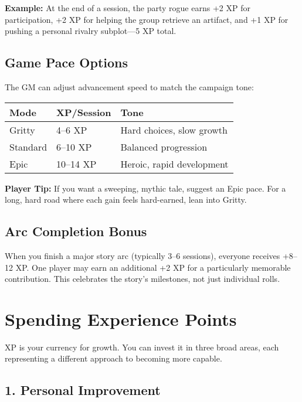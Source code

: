 \documentclass[11pt,twoside,openany]{book}
\begin{document}
\textbf{Example:} At the end of a session, the party rogue earns +2 XP for participation, +2 XP for helping the group retrieve an artifact, and +1 XP for pushing a personal rivalry subplot—5 XP total.

\subsection*{Game Pace Options}

The GM can adjust advancement speed to match the campaign tone:

\begin{center}
\begin{tabular}{|l|l|l|}
\hline
\textbf{Mode} & \textbf{XP/Session} & \textbf{Tone} \\
\hline
Gritty & 4–6 XP & Hard choices, slow growth \\
Standard & 6–10 XP & Balanced progression \\
Epic & 10–14 XP & Heroic, rapid development \\
\hline
\end{tabular}
\end{center}

\textbf{Player Tip:} If you want a sweeping, mythic tale, suggest an Epic pace. For a long, hard road where each gain feels hard-earned, lean into Gritty.

\subsection*{Arc Completion Bonus}

When you finish a major story arc (typically 3–6 sessions), everyone receives +8–12 XP. One player may earn an additional +2 XP for a particularly memorable contribution. This celebrates the story's milestones, not just individual rolls.

\section*{Spending Experience Points} 

XP is your currency for growth. You can invest it in three broad areas, each representing a different approach to becoming more capable.

\subsection*{1. Personal Improvement}
\end{document}
